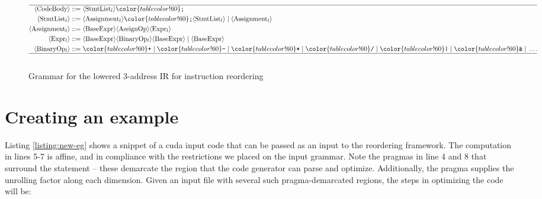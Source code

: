 \begin{figure}[t!]
  \footnotesize
  \begin{align}
    \hline
    \langle\text{CodeBody}\rangle ::=& \;  \langle\text{StmtList$_l$}\rangle {\color{tablecolor!60}\texttt{;}} \nonumber \\
    \langle\text{StmtList$_l$}\rangle ::=& \; \langle\text{Assignment$_l$}\rangle {\color{tablecolor!60}\texttt{;}} \langle\text{StmtList$_l$}\rangle \; | \; \langle\text{Assignment$_l$}\rangle \nonumber \\
    \langle\text{Assignment$_l$}\rangle ::=& \; \langle\text{BaseExpr}\rangle \langle\text{AssignOp}\rangle \langle\text{Expr$_l$}\rangle \nonumber \\
    \langle\text{Expr$_l$}\rangle ::=& \; \langle\text{BaseExpr}\rangle \langle\text{BinaryOp$_l$}\rangle \langle\text{BaseExpr}\rangle \; | \; \langle\text{BaseExpr}\rangle \nonumber \\
    \langle\text{BinaryOp$_l$}\rangle ::=& \; {\color{tablecolor!60}\texttt{+}} \; | \; {\color{tablecolor!60}\texttt{-}} \; | \; {\color{tablecolor!60}\texttt{*}} \; | \; {\color{tablecolor!60}\texttt{/}} \; | \; {\color{tablecolor!60}\texttt{|}} \; | \; {\color{tablecolor!60}\texttt{\&}} \; | \; \ldots \nonumber  \\
    \hline \nonumber
  \end{align}
   \vspace*{-0.6cm}
  \caption{Grammar for the lowered 3-address IR for instruction reordering}
\label{fig:lower-grammar}
\end{figure}



\section{Creating an example}
Listing \ref{listing:new-eg} shows a snippet of a cuda input code that can be
passed as an input to the reordering framework. The computation in lines 5-7 is
affine, and in compliance with the restrictions we placed on the input grammar.
Note the pragmas in line 4 and 8 that surround the statement -- these demarcate
the region that the code generator can parse and optimize. Additionally, the
pragma supplies the unrolling factor along each dimension. Given an input file
with several such pragma-demarcated regions, the steps in optimizing the code
will be: 


